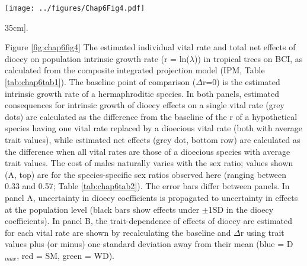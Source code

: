 \documentclass[b5paper,justified]{tufte-book} %
\begin{document}
\begin{fullwidth}
\begin{landscape}
\begin{figure*}
\hspace*{3cm} \texttt{[image: ../figures/Chap6Fig4.pdf]}
\caption[The estimated individual vital rate and total net effects of dioecy on population intrinsic growth rate ][35cm]{.}
\label{fig:chap6fig4}
\hspace*{3.4cm} \begin{minipage}{22.3cm}
\footnotesize Figure \ref{fig:chap6fig4} 
The estimated individual vital rate and total net effects of dioecy on population intrinsic growth rate (r = ln($\lambda$)) in tropical trees on BCI, as calculated from the composite integrated projection model (IPM, Table \ref{tab:chap6tab1}). The baseline point of comparison ($\Delta$r=0) is the estimated intrinsic growth rate of a hermaphroditic species.  In both panels, estimated consequences for intrinsic growth of dioecy effects on a single vital rate (grey dots) are calculated as the difference from the baseline of the r of a hypothetical species having one vital rate replaced by a dioecious vital rate (both with average trait values), while estimated net effects (grey dot, bottom row) are calculated as the difference when all vital rates are those of a dioecious species with average trait values.  The cost of males naturally varies with the sex ratio; values shown (A, top) are for the species-specific sex ratios observed here (ranging between 0.33 and 0.57; Table \ref{tab:chap6tab2}).   The error bars differ between panels. In panel A, uncertainty in dioecy coefficients is propagated to uncertainty in effects at the population level (black bars show effects under $\pm$1SD in the dioecy coefficients).  In panel B, the trait-dependence of effects of dioecy are estimated for each vital rate are shown by recalculating the baseline and $\Delta$r using trait values plus (or minus) one standard deviation away from their mean (blue = D$_{max}$, red = SM, green = WD).
\end{minipage}
\end{figure*}
\end{landscape}


\end{fullwidth}
\end{document}

